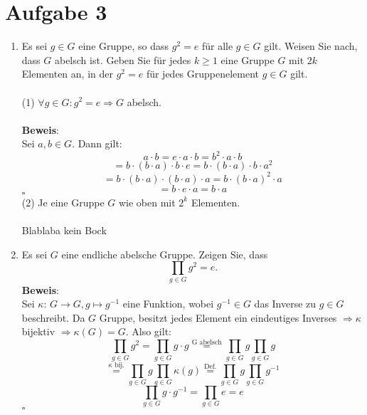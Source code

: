 \documentclass[11pt,a4paper,ngerman]{article}
\begin{document}
\section*{Aufgabe 3}
\begin{enumerate}[\bfseries a)]
\item Es sei $g \in G$ eine Gruppe, so dass $g^2 = e$ für alle $g \in G$ gilt. Weisen Sie nach, dass $G$ abelsch ist. Geben Sie für jedes $k \geq 1$ eine Gruppe $G$ mit $2k$ Elementen an, in der $g^2 = e$ für jedes Gruppenelement $g \in G$ gilt.
\\ \\
(1) $\forall g \in G: g^2 = e \Rightarrow G$ abelsch. \\ \\
\textbf{Beweis}: \\
Sei $a,b \in G$. Dann gilt:
$$ a \cdot b = e \cdot a \cdot b = b^2 \cdot a \cdot b $$
$$ = b \cdot (b \cdot a) \cdot b \cdot e = b \cdot (b \cdot a) \cdot b \cdot a^2 $$
$$ = b \cdot (b \cdot a) \cdot  (b \cdot a) \cdot a = b \cdot (b \cdot a)^2 \cdot a $$
$$ = b \cdot e \cdot a = b \cdot a$$
\mbox{} \hfill $\square$
\\
(2) Je eine Gruppe $G$ wie oben mit $2^k$ Elementen. \\ \\
Blablaba kein Bock
\item Es sei $G$ eine endliche abelsche Gruppe. Zeigen Sie, dass 
$$ \prod_{g\in G}g^2 = e.$$
\textbf{Beweis}: \\
Sei $\kappa:\,G \to G, g \mapsto g^{-1}$ eine Funktion, wobei $g^{-1} \in G$ das Inverse zu $g \in G$ beschreibt. Da $G$ Gruppe, besitzt jedes Element ein eindeutiges Inverses $\Rightarrow \kappa$ bijektiv $\Rightarrow \kappa(G) = G$.
Also gilt: \\
$$ \prod_{g\in G}g^2 = \prod_{g\in G}g \cdot g \stackrel{\text{G abelsch}}{=} \prod_{g\in G}g \prod_{g\in G}g  $$
$$ \stackrel{\kappa \text{ bij.}}{=} \prod_{g\in G}g \prod_{g\in G}\kappa(g)
 \stackrel{\text{Def.}}{=} \prod_{g\in G}g \prod_{g\in G} g^{-1} $$
$$ \prod_{g\in G}g \cdot g^{-1} =  \prod_{g\in G}e = e $$
\mbox{} \hfill $\square$
\end{enumerate}
\end{document}
